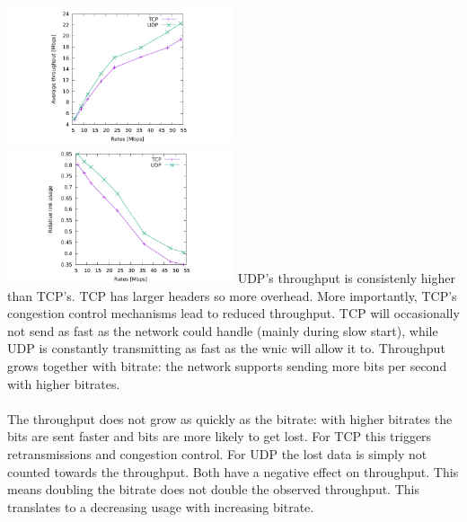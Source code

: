 \includegraphics[width=0.5\textwidth]{traces/L3-1-4-tput.pdf}
\includegraphics[width=0.5\textwidth]{traces/L3-1-4-usage.pdf}
UDP's throughput is consistenly higher than TCP's. TCP has larger headers so more overhead. More importantly, TCP's congestion control mechanisms lead to reduced throughput. TCP will occasionally not send as fast as the network could handle (mainly during slow start), while UDP is constantly transmitting as fast as the wnic will allow it to. Throughput grows together with bitrate: the network supports sending more bits per second with higher bitrates. \\ \\
The throughput does not grow as quickly as the bitrate: with higher bitrates the bits are sent faster and bits are more likely to get lost. For TCP this triggers retransmissions and congestion control. For UDP the lost data is simply not counted towards the throughput. Both have a negative effect on throughput. This means doubling the bitrate does not double the observed throughput. This translates to a decreasing usage with increasing bitrate.
